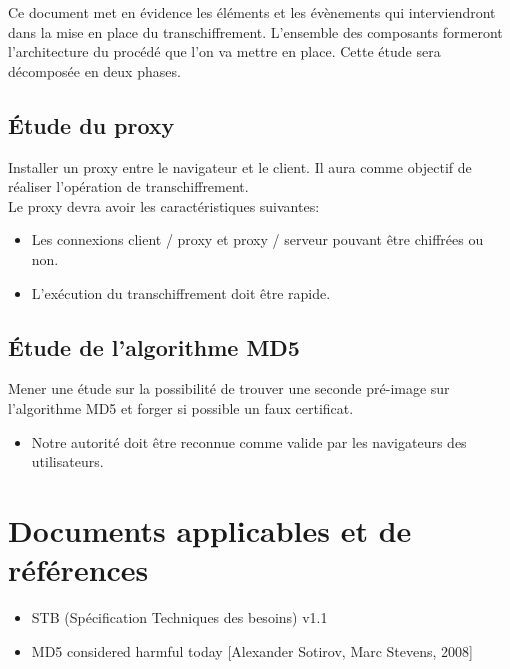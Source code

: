 \documentclass[a4paper,11pt,french]{article}
\begin{document}
Ce document met en évidence les éléments et les évènements qui interviendront dans la mise en place du transchiffrement. L'ensemble des composants formeront l'architecture du procédé que l'on va mettre en place. Cette étude sera décomposée en deux phases.  

\subsection{\'Etude du proxy}
Installer un proxy entre le navigateur et le client. Il aura comme objectif de réaliser l'opération de transchiffrement.  \\
Le proxy devra avoir les caractéristiques suivantes:
\begin{itemize}
\item Les connexions client / proxy et proxy / serveur pouvant être  chiffrées ou non.
\item L'exécution du transchiffrement doit être rapide.
\end{itemize}

\subsection{\'Etude de l'algorithme MD5}
Mener une étude sur la possibilité de trouver une seconde pré-image sur l'algorithme MD5 et forger si possible un faux certificat.  \\ 
\begin{itemize}
\item Notre autorité doit être reconnue comme valide par les navigateurs des utilisateurs.
\end{itemize}



\section{Documents applicables et de références}
\begin{itemize}
\item STB (Spécification Techniques des besoins) v1.1
\item MD5 considered harmful today [Alexander Sotirov, Marc Stevens, 2008]
\end{itemize}



\end{document}

